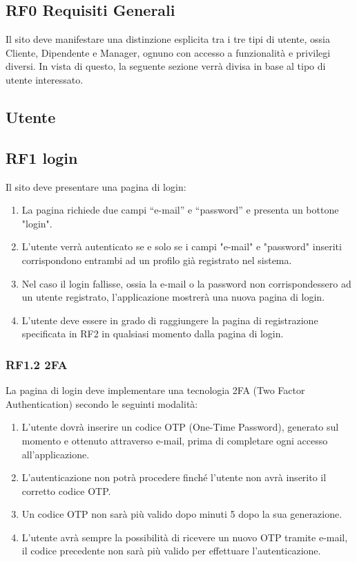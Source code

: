 \documentclass{report}
\begin{document}
\subsection*{RF0 Requisiti Generali}
Il sito deve manifestare una distinzione esplicita tra i tre tipi di utente, ossia Cliente, Dipendente e Manager, ognuno con accesso a funzionalità e privilegi diversi.
In vista di questo, la seguente sezione verrà divisa in base al tipo di utente interessato.

\subsection{Utente}

\subsection*{RF1 login}
Il sito deve presentare una pagina di login:
\begin{enumerate}
	\item La pagina richiede due campi “e-mail” e “password” e presenta un bottone "login".
	
	\item L'utente verrà autenticato se e solo se i campi "e-mail" e "password" inseriti corrispondono entrambi ad un profilo già registrato nel sistema.
	
	\item Nel caso il login fallisse, ossia la e-mail o la password non corrispondessero ad un utente registrato, l’applicazione mostrerà una nuova pagina di login.
	
	\item L’utente deve essere in grado di raggiungere la pagina di registrazione specificata in RF2 in qualsiasi momento dalla pagina di login.
	
\end{enumerate}

	\subsubsection{RF1.2 2FA}
	La pagina di login deve implementare una tecnologia 2FA (Two Factor Authentication) secondo le seguinti modalità:
	
	\begin{enumerate}
	\item L’utente dovrà inserire un codice OTP (One-Time Password), generato sul momento e ottenuto attraverso e-mail, prima di completare ogni accesso all’applicazione. 
	
	\item 	L’autenticazione non potrà procedere finché l’utente non avrà inserito il corretto codice OTP.
	
	\item Un codice OTP non sarà più valido dopo minuti 5 dopo la sua generazione.
	
	\item L’utente avrà sempre la possibilità di ricevere un nuovo OTP tramite e-mail, il codice precedente non sarà più valido per effettuare l’autenticazione.

	\end{enumerate}
	
\end{document}
